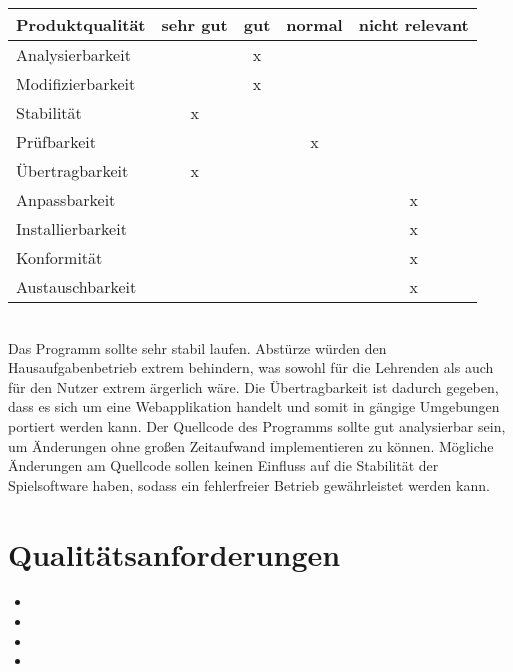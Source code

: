 \begin{tabular}{|l|c|c|c|c|}
	\hline
	\textbf{Produktqualität} & \textbf{sehr gut} & \textbf{gut} & \textbf{normal} & \textbf{nicht relevant} \\ \hline
	Analysierbarkeit         &                   &      x       &                 &                         \\ 
	\hline
	Modifizierbarkeit        &                   &      x       &                 &                         \\ 
	\hline
	Stabilität               &         x         &              &                 &                         \\ 
	\hline
	Prüfbarkeit              &                   &             &        x         &                         \\ 
	\hline
	Übertragbarkeit          &       x      &              &                 &                         \\ 
	\hline
	Anpassbarkeit            &                  &              &                 &          x              \\ 
	\hline
	Installierbarkeit        &                   &             &                 &            x             \\ 
	\hline
	Konformität              &                   &             &                 &            x             \\ 
	\hline
	Austauschbarkeit         &                   &              &                &            x             \\ 
	\hline
\end{tabular} \\

Das Programm sollte sehr stabil laufen. Abstürze würden den Hausaufgabenbetrieb extrem behindern, was sowohl 
für die Lehrenden als auch für den Nutzer extrem ärgerlich wäre.
Die \"Ubertragbarkeit ist dadurch gegeben, dass es sich um eine Webapplikation handelt und somit in g\"angige Umgebungen portiert werden kann.
Der Quellcode des Programms sollte gut analysierbar sein, um Änderungen ohne großen
Zeitaufwand implementieren zu können. Mögliche Änderungen am Quellcode sollen keinen Einfluss auf die Stabilität der 
Spielsoftware haben, sodass ein fehlerfreier Betrieb gewährleistet werden kann. 


\section{Qualitätsanforderungen}

\begin{itemize}
\item  {}
\item  {}
\item  {} 
\item  {}
\end{itemize}
